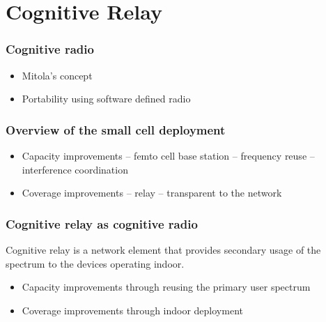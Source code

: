\chapter{Cognitive Relay}
\label{chap:wav}

\subsection{Cognitive radio}
\begin{itemize}
\item Mitola's concept
\item Portability using software defined radio
\end{itemize}

\subsection{Overview of the small cell deployment}
\begin{itemize}
\item Capacity improvements -- femto cell base station -- frequency reuse -- interference coordination 
\item Coverage improvements -- relay -- transparent to the network
\end{itemize}

\subsection{Cognitive relay as cognitive radio}
Cognitive relay is a network element that provides secondary usage of the spectrum to the devices operating indoor.
\begin{itemize}
\item Capacity improvements through reusing the primary user spectrum
\item Coverage improvements through indoor deployment
\end{itemize}






